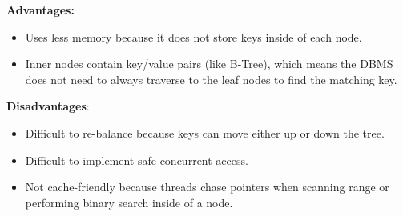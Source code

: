\documentclass[11pt]{article}
\begin{document}
\textbf{Advantages:}
\begin{itemize}
    \item
    Uses less memory because it does not store keys inside of each node.
    
    \item
    Inner nodes contain key/value pairs (like B-Tree), which means the DBMS does not need to always 
    traverse to the leaf nodes to find the matching key.
\end{itemize}

\textbf{Disadvantages}:
\begin{itemize}
    \item
    Difficult to re-balance because keys can move either up or down the tree.
    
    \item
    Difficult to implement safe concurrent access.
    
    \item
    Not cache-friendly because threads chase pointers when scanning range or performing binary 
    search inside of a node.
\end{itemize}
\end{document}
